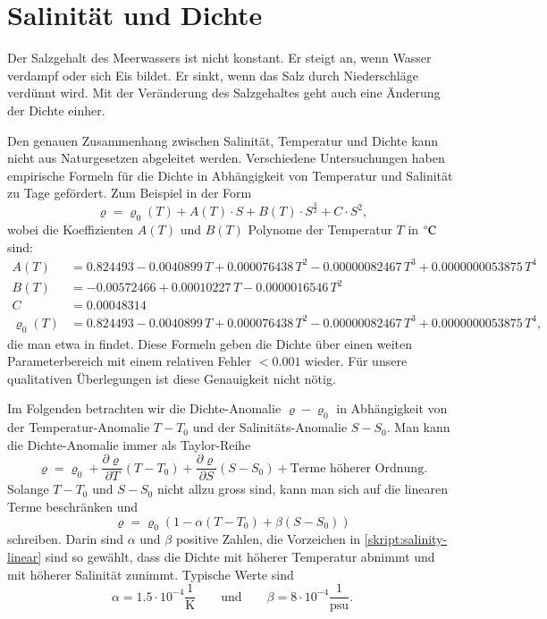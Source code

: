 %
%
%
\section{Salinität und Dichte}
Der Salzgehalt des Meerwassers ist nicht konstant.
Er steigt an, wenn Wasser verdampf oder sich Eis bildet.
Er sinkt, wenn das Salz durch Niederschläge verdünnt wird.
Mit der Veränderung des Salzgehaltes geht auch eine Änderung
der Dichte einher.

Den genauen Zusammenhang zwischen Salinität, Temperatur und Dichte
kann nicht aus Naturgesetzen abgeleitet werden.
Verschiedene Untersuchungen haben empirische Formeln für die
Dichte in Abhängigkeit von Temperatur und Salinität zu Tage
gefördert.
Zum Beispiel  in der Form
\[
\varrho
=
\varrho_0(T)
+
A(T)\cdot S + B(T)\cdot S^{\frac32}+C\cdot S^2,
\]
wobei die Koeffizienten $A(T)$ und $B(T)$ Polynome der Temperatur $T$ in
$\mathstrut^\circ\text{C}$ sind:
\begin{align*}
A(T)
&=
 0.824493 - 0.0040899\,T + 0.000076438\,T^2 - 0.00000082467\,T^3 + 0.0000000053875\,T^4
\\
B(T)
&=
 -0.00572466 + 0.00010227\,T - 0.0000016546\,T^2
\\
C
&=
0.00048314
\\
\varrho_0(T)
&=
 0.824493 - 0.0040899\,T + 0.000076438\,T^2
 - 0.00000082467\,T^3 + 0.0000000053875\,T^4,
\end{align*}
die man etwa in
\cite{skript:millero}
findet.
Diese Formeln geben die Dichte über einen weiten Parameterbereich
mit einem relativen Fehler $<0.001$ wieder.
Für unsere qualitativen Überlegungen ist diese Genauigkeit
nicht nötig.

Im Folgenden betrachten wir die Dichte-Anomalie $\varrho-\varrho_0$
in Abhängigkeit von der Temperatur-Anomalie $T-T_0$ und der
Salinitäts-Anomalie $S-S_0$.
Man kann die Dichte-Anomalie immer als Taylor-Reihe
\[
\varrho 
=
\varrho_0
+
\frac{\partial \varrho}{\partial T}(T-T_0)
+
\frac{\partial \varrho}{\partial S}(S-S_0)
+
\text{Terme höherer Ordnung}.
\]
Solange $T-T_0$ und $S-S_0$ nicht allzu gross sind, kann man sich auf
die linearen Terme beschränken und
\begin{equation}
\varrho
=
\varrho_0(1-\alpha(T-T_0)+\beta(S-S_0))
\label{skript:salinity-linear}
\end{equation}
schreiben.
Darin sind $\alpha$ und $\beta$ positive Zahlen, die Vorzeichen in
\eqref{skript:salinity-linear} sind so gewählt, dass die Dichte
mit höherer Temperatur abnimmt und mit höherer Salinität zunimmt.
Typische Werte sind
\[
\alpha = 1.5\cdot 10^{-4}\frac{1}{\text{K}}
\qquad
\text{und}
\qquad
\beta = 8\cdot 10^{-4}\frac{1}{\text{psu}}.
\]

